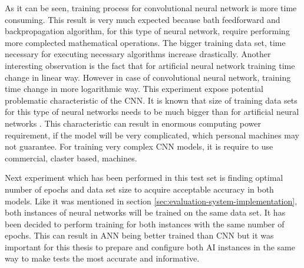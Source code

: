 As it can be seen, training process for convolutional neural network is more time consuming. This result is very much expected because bath feedforward and backpropagation algorithm, for this type of neural network, require performing more complected mathematical operations. The bigger training data set, time necessary for executing necessary algorithms increase drastically. Another interesting observation is the fact that for artificial neural network training time change in linear way. However in case of convolutional neural network, training time change in more logarithmic way. This experiment expose potential problematic characteristic of the CNN. It is known that size of training data sets for this type of neural networks needs to be much bigger than for artificial neural networks \cite{bib:book-deep-learning-practitioner-approach,bib:book-generative-deep-learning}. This characteristic can result in enormous computing power requirement, if the model will be very complicated, which personal machines may not guarantee. For training very complex CNN models, it is require to use commercial, claster based, machines.

Next experiment which has been performed in this test set is finding optimal number of epochs and data set size to acquire acceptable accuracy in both models. Like it was mentioned in section \ref{sec:evaluation-system-implementation}, both instances of neural networks will be trained on the same data set. It has been decided to perform training for both instances with the same number of epochs. This can result in ANN being better trained than CNN but it was important for this thesis to prepare and configure both AI instances in the same way to make tests the most accurate and informative.

